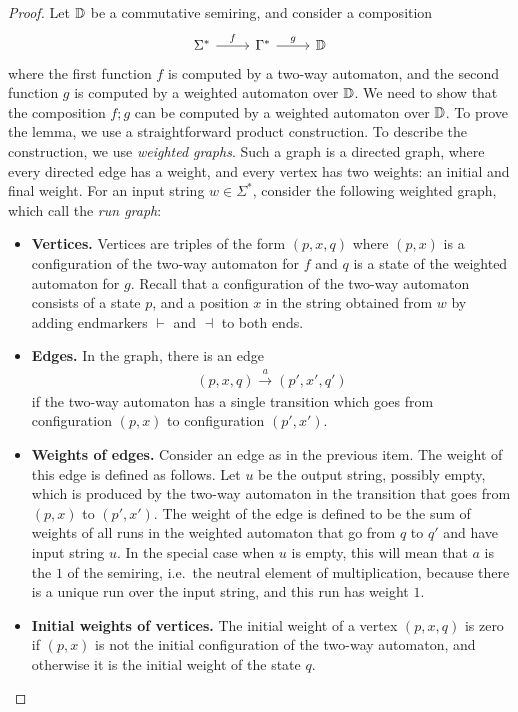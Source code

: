 \begin{proof}
        Let $\mathbb D$ be a commutative semiring, and  consider  a composition 
    \[
    \begin{tikzcd}
    \Sigma^* 
    \ar[r,"f"]
    & 
    \Gamma^*
    \ar[r,"g"]
    &
    \domain
    \end{tikzcd}
    \]
    where the first function $f$ is computed by a two-way automaton, and the second function $g$ is computed by a weighted automaton over $\mathbb D$. We need to show that the composition $f;g$ can be computed by a weighted automaton over $\mathbb D$. To prove the lemma, we use a straightforward product construction. To describe the construction, we use \emph{weighted graphs}. Such a graph is a directed graph, where every directed edge has a weight, and every vertex has two weights: an initial and final weight. For an input string $w \in \Sigma^*$, consider the following weighted graph, which call the \emph{run graph}:
    \begin{itemize}
        \item \textbf{Vertices.} Vertices are triples of the form $(p,x,q)$ where $(p,x)$ is a configuration of the two-way automaton for $f$ and  $q$ is a state of the weighted automaton for $g$. Recall that a configuration of the two-way automaton consists of a state $p$, and a position  $x$  in the string obtained from $w$ by adding endmarkers $\vdash$ and $\dashv$ to both ends. 
        \item \textbf{Edges.} In the graph, there is an edge 
        \begin{align*}
        (p,x,q) \xrightarrow{a} (p',x',q')
        \end{align*}
        if the two-way automaton has a single transition which goes from configuration $(p,x)$ to configuration $(p',x')$.
        \item \textbf{Weights of edges.} Consider an edge as in the previous item. The weight of this edge is defined as follows. Let $u$ be the output string, possibly empty, which is produced by the two-way automaton in the transition that goes from $(p,x)$ to $(p',x')$. The weight of the edge is defined to be the  sum of weights of all runs in the weighted automaton that go from $q$ to $q'$ and have input string $u$. In the special case when $u$ is empty, this will mean that $a$ is the $1$ of the semiring, i.e.~the neutral element of multiplication, because there is a unique run over the input string, and this run has weight $1$. 
        \item \textbf{Initial weights of vertices.} The initial weight of a vertex $(p,x,q)$ is zero if $(p,x)$ is not the initial configuration of the two-way automaton, and otherwise it is the initial weight of  the state $q$.

\end{itemize}
\end{proof}
